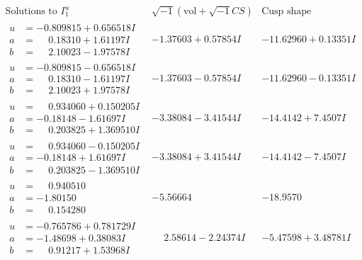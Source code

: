\documentclass[1p]{elsarticle_modified}
\theoremstyle{definition}
\newcommand{\I}{\sqrt{-1}}
\begin{document}
$$\begin{array}{c|c|c}  
\text{Solutions to }I^u_{1}& \I (\text{vol} + \sqrt{-1}CS) & \text{Cusp shape}\\
 \hline 
\begin{aligned}
u &= -0.809815 + 0.656518 I \\
a &= \phantom{-}0.18310 + 1.61197 I \\
b &= \phantom{-}2.10023 - 1.97578 I\end{aligned}
 & -1.37603 + 0.57854 I & -11.62960 + 0.13351 I \\ \hline\begin{aligned}
u &= -0.809815 - 0.656518 I \\
a &= \phantom{-}0.18310 - 1.61197 I \\
b &= \phantom{-}2.10023 + 1.97578 I\end{aligned}
 & -1.37603 - 0.57854 I & -11.62960 - 0.13351 I \\ \hline\begin{aligned}
u &= \phantom{-}0.934060 + 0.150205 I \\
a &= -0.18148 - 1.61697 I \\
b &= \phantom{-}0.203825 + 1.369510 I\end{aligned}
 & -3.38084 - 3.41544 I & -14.4142 + 7.4507 I \\ \hline\begin{aligned}
u &= \phantom{-}0.934060 - 0.150205 I \\
a &= -0.18148 + 1.61697 I \\
b &= \phantom{-}0.203825 - 1.369510 I\end{aligned}
 & -3.38084 + 3.41544 I & -14.4142 - 7.4507 I \\ \hline\begin{aligned}
u &= \phantom{-}0.940510\phantom{ +0.000000I} \\
a &= -1.80150\phantom{ +0.000000I} \\
b &= \phantom{-}0.154280\phantom{ +0.000000I}\end{aligned}
 & -5.56664\phantom{ +0.000000I} & -18.9570\phantom{ +0.000000I} \\ \hline\begin{aligned}
u &= -0.765786 + 0.781729 I \\
a &= -1.48698 + 0.38083 I \\
b &= \phantom{-}0.91217 + 1.53968 I\end{aligned}
 & \phantom{-}2.58614 - 2.24374 I & -5.47598 + 3.48781 I \\ \hline\begin{aligned}

\end{aligned}
\end{array}$$
\end{document}
